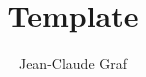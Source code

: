 \documentclass{scrartcl}
\begin{document}
    \rhead{\today}

    \title{Template}
    \author{Jean-Claude Graf}
    \maketitle

    \tableofcontents

    
    
    
\end{document}
